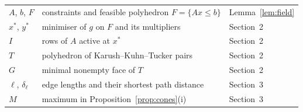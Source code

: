 \documentclass[11pt]{amsart}
\theoremstyle{remark}
\numberwithin{equation}{section}
\begin{document}
\begin{center}
\begin{tabular}{@{}lp{}l@{}}
$A$, $b$, $F$ & constraints and feasible polyhedron $F=\{Ax\le b\}$ & Lemma~\ref{lem:field} \\
$x^*$, $y^*$ & minimiser of $g$ on $F$ and its multipliers & Section~2 \\
$I$ & rows of $A$ active at $x^*$ & Section~2 \\
$T$ & polyhedron of Karush--Kuhn--Tucker pairs & Section~2 \\
$G$ & minimal nonempty face of $T$ & Section~2 \\
$\ell$, $\delta_\ell$ & edge lengths and their shortest path distance & Section~3 \\
$M$ & maximum in Proposition~\ref{prop:cones}(i) & Section~3 \\
\bottomrule\end{tabular}
\end{center}
\end{document}
